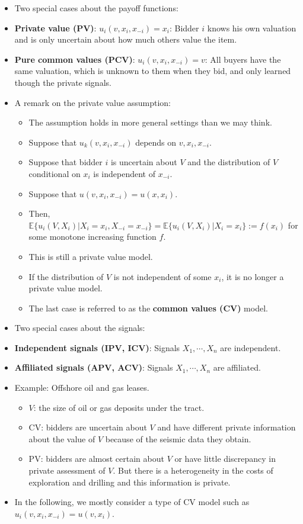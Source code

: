 \documentclass[
]{book}
\providecommand{\tightlist}{%
  \setlength{\itemsep}{0pt}\setlength{\parskip}{0pt}}
\begin{document}
\begin{itemize}
\tightlist
\item
  Two special cases about the payoff functions:
\item
  \textbf{Private value (PV)}: \(u_i(v, x_i, x_{-i}) = x_i\): Bidder \(i\) knows his own valuation and is only uncertain about how much others value the item.
\item
  \textbf{Pure common values (PCV)}: \(u_i(v, x_i, x_{-i}) = v\): All buyers have the same valuation, which is unknown to them when they bid, and only learned though the private signals.
\item
  A remark on the private value assumption:

  \begin{itemize}
  \tightlist
  \item
    The assumption holds in more general settings than we may think.
  \item
    Suppose that \(u_k(v, x_i, x_{-i})\) depends on \(v, x_i, x_{-i}\).
  \item
    Suppose that bidder \(i\) is uncertain about \(V\) and the distribution of \(V\) conditional on \(x_i\) is independent of \(x_{-i}\).
  \item
    Suppose that \(u(v, x_i, x_{-i}) = u(x, x_i)\).
  \item
    Then, \(\mathbb{E}\{u_i(V, X_i)|X_i = x_i, X_{-i} = x_{-i}\} = \mathbb{E}\{u_i(V, X_i)|X_i = x_i\} := f(x_i)\) for some monotone increasing function \(f\).
  \item
    This is still a private value model.
  \item
    If the distribution of \(V\) is not independent of some \(x_i\), it is no longer a private value model.
  \item
    The last case is referred to as the \textbf{common values (CV)} model.
  \end{itemize}
\item
  Two special cases about the signals:
\item
  \textbf{Independent signals (IPV, ICV)}: Signals \(X_1, \cdots, X_n\) are independent.
\item
  \textbf{Affiliated signals (APV, ACV)}: Signals \(X_1, \cdots, X_n\) are affiliated.
\item
  Example: Offshore oil and gas leases.

  \begin{itemize}
  \tightlist
  \item
    \(V\): the size of oil or gas deposits under the tract.
  \item
    CV: bidders are uncertain about \(V\) and have different private information about the value of \(V\) because of the seismic data they obtain.
  \item
    PV: bidders are almost certain about \(V\) or have little discrepancy in private assessment of \(V\). But there is a heterogeneity in the costs of exploration and drilling and this information is private.
  \end{itemize}
\item
  In the following, we mostly consider a type of CV model such as \(u_i(v, x_i, x_{-i}) = u(v, x_i)\).
\end{itemize}
\end{document}
